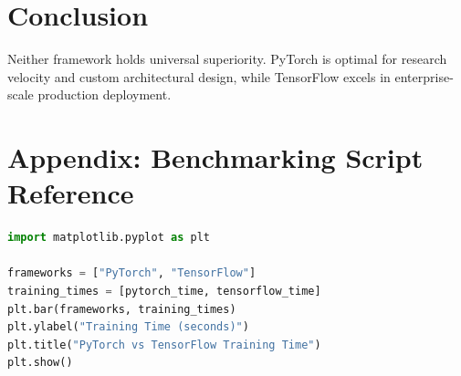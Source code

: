\documentclass[11pt, a4paper]{article}
\begin{document}
\section{Conclusion}
Neither framework holds universal superiority. PyTorch is optimal for research velocity and custom architectural design, while TensorFlow excels in enterprise-scale production deployment.

\newpage
\appendix
\section{Appendix: Benchmarking Script Reference}
\begin{lstlisting}[language=Python, caption=Benchmark Execution Logic]
import matplotlib.pyplot as plt

frameworks = ["PyTorch", "TensorFlow"]
training_times = [pytorch_time, tensorflow_time]
plt.bar(frameworks, training_times)
plt.ylabel("Training Time (seconds)")
plt.title("PyTorch vs TensorFlow Training Time")
plt.show()
\end{lstlisting}
\end{document}
